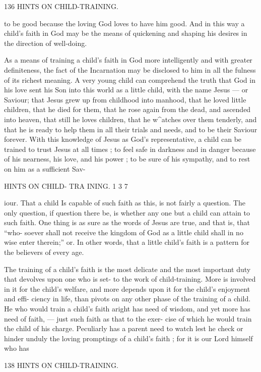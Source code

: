 \documentclass[
]{book}
\begin{document}
136 HINTS ON CHILD-TRAINING.

to be good because the loving God loves to have him good. And in this way a child's faith in God may be the means of quickening and shaping his desires in the direction of well-doing.

As a means of training a child's faith in God more intelligently and with greater definiteness, the fact of the Incarnation may be disclosed to him in all the fulness of its richest meaning. A very young child can comprehend the truth that God in his love sent his Son into this world as a little child, with the name Jesus --- or Saviour; that Jesus grew up from childhood into manhood, that he loved little children, that he died for them, that he rose again from the dead, and ascended into heaven, that still he loves children, that he w\^{}atches over them tenderly, and that he is ready to help them in all their trials and needs, and to be their Saviour forever. With this knowledge of Jesus as God's representative, a child can be trained to trust Jesus at all times ; to feel safe in darkness and in danger because of his nearness, his love, and his power ; to be sure of his sympathy, and to rest on him as a sufficient Sav-

HINTS ON CHILD- TRA INING. 1 3 7

iour. That a child Is capable of such faith as this, is not fairly a question. The only question, if question there be, is whether any one but a child can attain to such faith. One thing is as sure as the words of Jesus are true, and that is, that ``who- soever shall not receive the kingdom of God as a little child shall in no wise enter therein;'' or. In other words, that a little child's faith is a pattern for the believers of every age.

The training of a child's faith is the most delicate and the most important duty that devolves upon one who is set- to the work of child-training. More is involved in it for the child's welfare, and more depends upon it for the child's enjoyment and effi- ciency in life, than pivots on any other phase of the training of a child. He who would train a child's faith aright has need of wisdom, and yet more has need of faith, --- just such faith as that to the exer- cise of which he would train the child of his charge. Peculiarly has a parent need to watch lest he check or hinder unduly the loving promptings of a child's faith ; for it is our Lord himself who has

138 HINTS ON CHILD-TRAINING.
\end{document}

